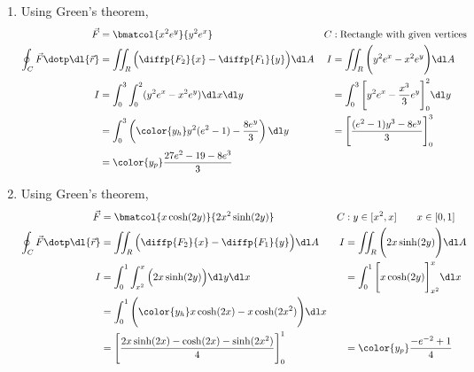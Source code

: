 \begin{enumerate}
    \item Using Green's theorem,
          \begin{align}
              \vec{F} & = \bmatcol{x^2 e^y}{y^2 e^x}                                 &
              C       & : \text{Rectangle with given vertices}                         \\
              \oint_C \vec{F} \dotp \dl{\vec{r}}
                      & = \iint_R \Big( \diffp {F_2}{x} - \diffp{F_1}{y} \Big) \dl A &
              I       & = \iint_R \Bigg( y^2 e^x - x^2 e^y \Bigg) \dl A                \\
              I       & = \int_{0}^{3} \int_{0}^{2} (y^2 e^x - x^2 e^y) \dl x \dl y  &
                      & =  \int_{0}^{3} \Bigg[ y^2e^x - \frac{x^3}{3}e^y
              \Bigg]_{0}^{2} \dl y                                                     \\
                      & = \int_{0}^{3} \left({\color{y_h} y^2 (e^2 - 1)
                          - \frac{8e^y}{3}}\right)
              \dl y   &
                      & = \Bigg[ \frac{(e^2 - 1)y^3 - 8e^y}{3} \Bigg]_{0}^{3}          \\
                      & = \color{y_p} \frac{27e^2 - 19 - 8e^3}{3}
          \end{align}

    \item Using Green's theorem,
          \begin{align}
              \vec{F}        & = \bmatcol{x \cosh(2y) }{2x^2 \sinh(2y)}           &
              C              & : y \in [x^2 , x] \qquad x \in [0, 1]                \\
              \oint_C \vec{F} \dotp \dl{\vec{r}}
                             & = \iint_R \Big( \diffp {F_2}{x} - \diffp{F_1}{y}
              \Big)
              \dl A          &
              I              & = \iint_R \Bigg( 2x\sinh(2y) \Bigg) \dl A            \\
              I              & = \int_{0}^{1} \int_{x^2}^{x} \Big( 2x\sinh(2y)
              \Big)
              \dl y
              \dl x          &
                             & =  \int_{0}^{1} \Bigg[ x\cosh(2y) \Bigg]_{x^2}^{x}
              \dl x                                                                 \\
                             & = \int_{0}^{1} \Bigg({\color{y_h} x \cosh(2x) -
                  x\cosh(2x^2)} \Bigg)
              \dl x                                                                 \\
                             & = \Bigg[ \frac{2x\sinh(2x) - \cosh(2x)
                      - \sinh(2x^2)}{4}
              \Bigg]_{0}^{1} &
                             & = \color{y_p} \frac{-e^{-2} + 1}{4}
          \end{align}


\end{enumerate}
